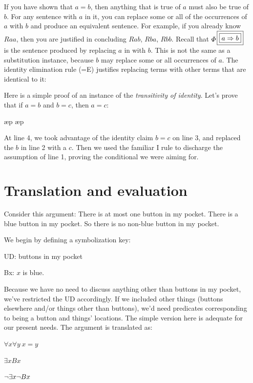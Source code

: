 If you have shown that $a{=}b$, then anything that is true of $a$ must also be true of $b$. For any sentence with $a$ in it, you can replace some or all of the occurrences of $a$ with $b$ and produce an equivalent sentence. For example, if you already know $Raa$, then you are justified in concluding $Rab$, $Rba$, $Rbb$. Recall that $\metaA{}\substitutesome{a}{b}$ is the sentence produced by replacing $a$ in \metaA{} with $b$. This is not the same as a substitution instance, because $b$ may replace some or all occurrences of $a$. The identity elimination rule ({=}E) justifies replacing terms with other terms that are identical to it:
\begin{ndproof}
	 
	 
\end{ndproof}

Here is a simple proof of an instance of the \emph{transitivity of identity}. Let's prove that if $a{=}b$ and $b{=}c$, then $a{=}c$:

\begin{ndproof}
	\open
		\ae{p}
		\ae{p}
	\close
	 
\end{ndproof}

At line 4, we took advantage of the identity claim $b{=}c$ on line 3, and replaced the $b$ in line 2 with a $c$. Then we used the familiar \eif{}I rule to discharge the assumption of line 1, proving the conditional we were aiming for.


\section{Translation and evaluation}

Consider this argument: There is at most one button in my pocket. There is a blue button in my pocket. So there is no non-blue button in my pocket.

We begin by defining a symbolization key:
\begin{ekey}
\item{UD:} buttons in my pocket
\item{Bx:} $x$ is blue.
\end{ekey}
Because we have no need to discuss anything other than buttons in my pocket, we've restricted the UD accordingly. If we included other things (buttons elsewhere and/or things other than buttons), we'd need predicates corresponding to being a button and things' locations. The simple version here is adequate for our present needs. The argument is translated as:
\begin{earg}
\item{} $\forall x \forall y\ x{=}y$
\item{} $\exists x Bx$
\item{\therefore} $\neg \exists x \neg Bx$
\end{earg}

